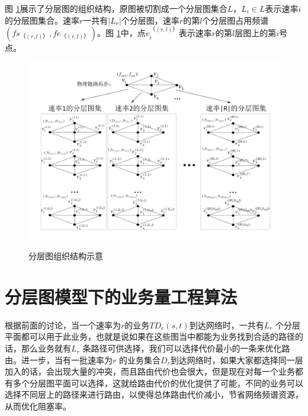 图 \ref{layer}展示了分层图的组织结构，原图被切割成一个分层图集合$L$，$L_i \in L$表示速率$i$的分层图集合。速率$r$一共有$|L_r|$个分层图，速率$r$的第$l$个分层图占用频谱$(fs_{（ (r,l) ）},fe_{（ (r,l) ）})$。图 \ref{layer}中，点$v_i^{（ (r,l) ）}$表示速率$r$的第$l$层图上的第$i$号点。
\begin{figure}
\setlength{\belowcaptionskip}{-0.5cm}
\begin{center}
{\includegraphics[width=1 \textwidth]{figures/LAYER.pdf}}
\end{center}
\caption{{\footnotesize{分层图组织结构示意}}}
\label{layer}
\end{figure}
\section{分层图模型下的业务量工程算法}
根据前面的讨论，当一个速率为$r$的业务$TD_r(s,t)$到达网络时，一共有$L_r$ 个分层平面都可以用于此业务，也就是说如果在这些图当中都能为业务找到合适的路径的话，那么业务就有$L_r$ 条路径可供选择，我们可以选择代价最小的一条来优化路由。进一步，当有一批速率为$r$ 的业务集合$D_r$到达网络时，如果大家都选择同一层加入的话，会出现大量的冲突，而且路由代价也会很大，但是现在对每一个业务都有多个分层图平面可以选择，这就给路由代价的优化提供了可能，不同的业务可以选择不同层上的路径来进行路由，以使得总体路由代价减小，节省网络频谱资源，从而优化阻塞率。

